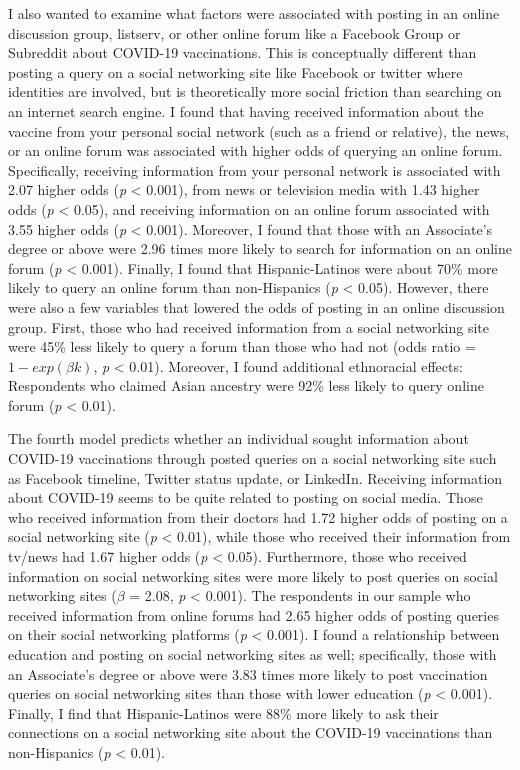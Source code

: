 I also wanted to examine what factors were associated with posting in an online
discussion group, listserv, or other online forum like a Facebook Group or
Subreddit about COVID-19 vaccinations. This is conceptually different than
posting a query on a social networking site like Facebook or twitter where
identities are involved, but is theoretically more social friction than
searching on an internet search engine. I found that having received information
about the vaccine from your personal social network (such as a friend or
relative), the news, or an online forum was associated with higher odds of
querying an online forum. Specifically, receiving information from your personal
network is associated with 2.07 higher odds (\emph{p} \textless{} 0.001), from
news or television media with 1.43 higher odds (\emph{p} \textless{} 0.05), and
receiving information on an online forum associated with 3.55 higher odds
(\emph{p} \textless{} 0.001). Moreover, I found that those with an Associate's
degree or above were 2.96 times more likely to search for information on an
online forum (\emph{p} \textless{} 0.001). Finally, I found that
Hispanic-Latinos were about 70\% more likely to query an online forum than
non-Hispanics (\emph{p} \textless{} 0.05). However, there were also a few
variables that lowered the odds of posting in an online discussion group. First,
those who had received information from a social networking site were 45\% less
likely to query a forum than those who had not (odds ratio = \(1 - exp(\beta
k)\), \emph{p} \textless{} 0.01). Moreover, I found additional ethnoracial
effects: Respondents who claimed Asian ancestry were 92\% less likely to query
online forum (\emph{p} \textless{} 0.01).

The fourth model predicts whether an individual sought information about
COVID-19 vaccinations through posted queries on a social networking site such as
Facebook timeline, Twitter status update, or LinkedIn. Receiving information
about COVID-19 seems to be quite related to posting on social media. Those who
received information from their doctors had 1.72 higher odds of posting on a
social networking site (\emph{p} \textless{} 0.01), while those who received
their information from tv/news had 1.67 higher odds (\emph{p} \textless{} 0.05).
Furthermore, those who received information on social networking sites were more
likely to post queries on social networking sites (\(\beta\) = 2.08, \emph{p}
\textless{} 0.001). The respondents in our sample who received information from
online forums had 2.65 higher odds of posting queries on their social networking
platforms (\emph{p} \textless{} 0.001). I found a relationship between education
and posting on social networking sites as well; specifically, those with an
Associate's degree or above were 3.83 times more likely to post vaccination
queries on social networking sites than those with lower education (\emph{p}
\textless{} 0.001). Finally, I find that Hispanic-Latinos were 88\% more likely
to ask their connections on a social networking site about the COVID-19
vaccinations than non-Hispanics (\emph{p} \textless{} 0.01).

